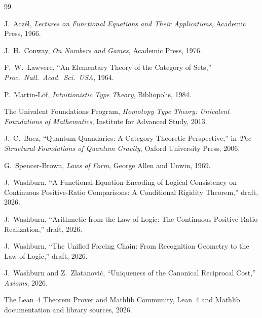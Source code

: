 \documentclass[11pt,a4paper]{article}
\theoremstyle{definition}
\theoremstyle{remark}
\begin{document}
\begin{thebibliography}{99}

J.~Acz\'el,
\emph{Lectures on Functional Equations and Their Applications},
Academic Press, 1966.

J.~H.~Conway,
\emph{On Numbers and Games},
Academic Press, 1976.

F.~W.~Lawvere,
``An Elementary Theory of the Category of Sets,''
\emph{Proc.\ Natl.\ Acad.\ Sci.\ USA}, 1964.

P.~Martin-L\"of,
\emph{Intuitionistic Type Theory},
Bibliopolis, 1984.

The Univalent Foundations Program,
\emph{Homotopy Type Theory: Univalent Foundations of Mathematics},
Institute for Advanced Study, 2013.

J.~C.~Baez,
``Quantum Quandaries: A Category-Theoretic Perspective,''
in \emph{The Structural Foundations of Quantum Gravity},
Oxford University Press, 2006.

G.~Spencer-Brown,
\emph{Laws of Form},
George Allen and Unwin, 1969.

J.~Washburn,
``A Functional-Equation Encoding of Logical Consistency on Continuous
Positive-Ratio Comparisons: A Conditional Rigidity Theorem,''
draft, 2026.

J.~Washburn,
``Arithmetic from the Law of Logic: The Continuous Positive-Ratio
Realization,''
draft, 2026.

J.~Washburn,
``The Unified Forcing Chain: From Recognition Geometry to the Law of
Logic,''
draft, 2026.

J.~Washburn and Z.~Zlatanovi\'c,
``Uniqueness of the Canonical Reciprocal Cost,''
\emph{Axioms}, 2026.

The Lean~4 Theorem Prover and Mathlib Community,
Lean~4 and Mathlib documentation and library sources, 2026.

\end{thebibliography}
\end{document}
